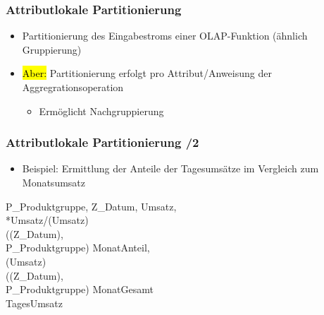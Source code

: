     
    \begin{frame}
    
    \frametitle{Attributlokale Partitionierung}
    
    
    \begin{itemize}
    \item Partitionierung des Eingabestroms einer OLAP-Funktion (ähnlich
      Gruppierung)
    \item \hl{Aber:} Partitionierung erfolgt pro Attribut/Anweisung der
      Aggregrationsoperation
      \begin{itemize}
      \item Ermöglicht Nachgruppierung
      \end{itemize}
    \end{itemize}
    
    \end{frame}
    
    \begin{frame}
    
      \frametitle{Attributlokale Partitionierung /2}
    
    
      \begin{itemize}
    \item Beispiel: Ermittlung der Anteile der Tagesumsätze im
      Vergleich zum Monatsumsatz
    \end{itemize}
         \begin{sql}
     P\_Produktgruppe, Z\_Datum, Umsatz,  \\
    *Umsatz/(Umsatz) \\
    \2 ((Z\_Datum),\\
    \3  P\_Produktgruppe)  MonatAnteil, \\
    \1 (Umsatz) \\
    \2 ((Z\_Datum),\\
    \3 P\_Produktgruppe)  MonatGesamt \\
     TagesUmsatz
      \end{sql}
    \end{frame}
    
    
